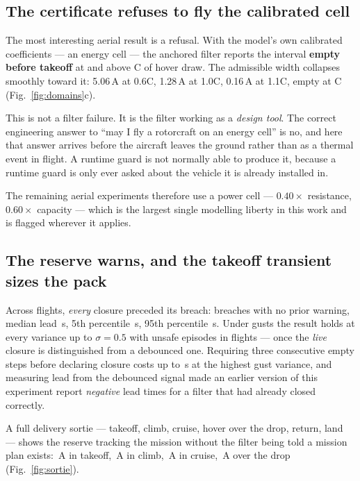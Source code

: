 \documentclass[11pt,letterpaper]{article}
\theoremstyle{definition}
\theoremstyle{remark}
\begin{document}
\subsection{The certificate refuses to fly the calibrated cell}\label{sec:refusal}

The most interesting aerial result is a refusal. With the model's own calibrated coefficients
--- an energy cell --- the anchored filter reports the interval \textbf{empty before takeoff} at
and above \aRefuseC{}C of hover draw. The admissible width collapses smoothly toward it:
5.06\,A at 0.6C, 1.28\,A at 1.0C, 0.16\,A at 1.1C, empty at \aRefuseC{}C
(Fig.~\ref{fig:domains}c).

This is not a filter failure. It is the filter working as a \emph{design tool}. The correct
engineering answer to ``may I fly a rotorcraft on an energy cell'' is no, and here that answer
arrives before the aircraft leaves the ground rather than as a thermal event in flight. A
runtime guard is not normally able to produce it, because a runtime guard is only ever asked
about the vehicle it is already installed in.

The remaining aerial experiments therefore use a power cell --- $0.40\times$ resistance,
$0.60\times$ capacity --- which is the largest single modelling liberty in this work and is
flagged wherever it applies.

\subsection{The reserve warns, and the takeoff transient sizes the pack}

Across \aLeadN{} flights, \emph{every} closure preceded its breach: \aLeadNoWarn{} breaches with
no prior warning, median lead \aLeadMed{}\,s, 5th percentile \aLeadPfive{}\,s, 95th percentile
\aLeadPninefive{}\,s. Under gusts the result holds at every variance up to $\sigma=0.5$ with
\aGustUnsafe{} unsafe episodes in \aGustTrials{} flights --- once the \emph{live} closure is
distinguished from a debounced one. Requiring three consecutive empty steps before declaring
closure costs up to \aGustDebounceHi{}\,s at the highest gust variance, and measuring lead from
the debounced signal made an earlier version of this experiment report \emph{negative} lead
times for a filter that had already closed correctly.

A full delivery sortie --- takeoff, climb, cruise, hover over the drop, return, land --- shows
the reserve tracking the mission without the filter being told a mission plan exists:
\aReserveTakeoff\,A in takeoff, \aReserveClimb\,A in climb, \aReserveCruiseOut\,A in cruise,
\aReserveHoverDrop\,A over the drop (Fig.~\ref{fig:sortie}).
\end{document}

